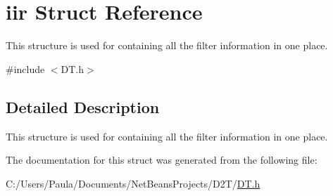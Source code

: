 \hypertarget{structiir}{}\section{iir Struct Reference}
\label{structiir}


This structure is used for containing all the filter information in one place.  




{\ttfamily \#include $<$D\+T.\+h$>$}



\subsection{Detailed Description}
This structure is used for containing all the filter information in one place. 

The documentation for this struct was generated from the following file\+:\begin{DoxyCompactItemize}
\item 
C\+:/\+Users/\+Paula/\+Documents/\+Net\+Beans\+Projects/\+D2\+T/\mbox{\hyperlink{_d_t_8h}{D\+T.\+h}}\end{DoxyCompactItemize}
